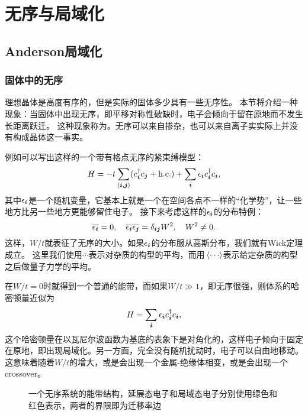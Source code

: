 \chapter{无序与局域化}

\section{Anderson局域化}

\subsection{固体中的无序}

理想晶体是高度有序的，但是实际的固体多少具有一些无序性。
本节将介绍一种现象：当固体中出现无序，即平移对称性破缺时，电子会倾向于留在原地而不发生长距离跃迁。
这种现象称为。无序可以来自掺杂，也可以来自离子实实际上并没有构成晶体这一事实。

例如可以写出这样的一个带有格点无序的紧束缚模型：
\begin{equation}
    {H} = - t \sum_{\langle \vb*{i}, \vb*{j} \rangle} ({c}_{\vb*{i}}^\dagger {c}_{\vb*{j}} + \text{h.c.}) + \sum_{\vb*{i}} \epsilon_{\vb*{i}} {c}_{\vb*{i}}^\dagger {c}_{\vb*{i}},
    \label{eq:tight-binding-with-disorder}
\end{equation}
其中$\epsilon_{\vb*{i}}$是一个随机变量，它基本上就是一个在空间各点不一样的“化学势”，让一些地方比另一些地方更能够留住电子。
接下来考虑这样的$\epsilon_{\vb*{i}}$的分布特例：
\begin{equation}
    \overline{\epsilon_{\vb*{i}}} = 0, \quad \overline{\epsilon_{\vb*{i}} \epsilon_{\vb*{j}}} = \delta_{\vb*{i} \vb*{j}} W^2 , \quad W^2 \neq 0.
\end{equation}
这样，$W/t$就表征了无序的大小。如果$\epsilon_{\vb*{i}}$的分布服从高斯分布，我们就有Wick定理成立。
这里我们使用$\overline{\cdots}$表示对杂质的构型的平均，而用$\expval*{\cdots}$表示给定杂质的构型之后做量子力学的平均。

在$W/t=0$时就得到一个普通的能带，而如果$W/t \gg 1$，即无序很强，则体系的哈密顿量近似为
\[
    {H} = \sum_{\vb*{i}} \epsilon_{\vb*{i}} {c}_{\vb*{i}}^\dagger {c}_{\vb*{i}},
\]
这个哈密顿量在以瓦尼尔波函数为基底的表象下是对角化的，这样电子倾向于固定在原地，即出现局域化。另一方面，完全没有随机扰动时，电子可以自由地移动。
这意味着随着$W/t$的增大，或是会出现一个金属-绝缘体相变，或是会出现一个crossover。

\begin{figure}
    \centering
    
    \caption{一个无序系统的能带结构，延展态电子和局域态电子分别使用绿色和红色表示，两者的界限即为迁移率边}
    \label{fig:disorder-band}
\end{figure}

